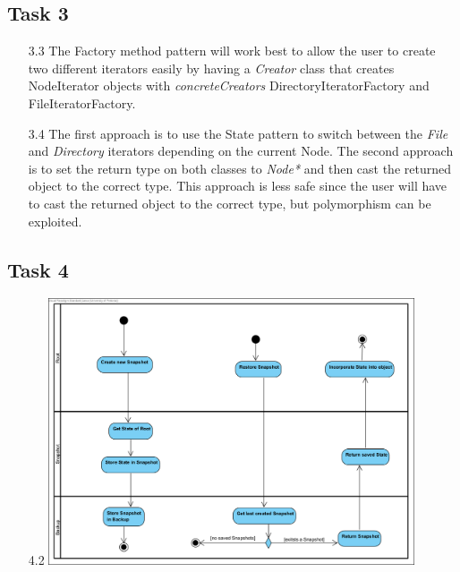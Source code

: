\documentclass{article}
\begin{document}
\subsection*{Task 3}
\begin{itemize}
    \item[3.3]The Factory method pattern will work best to allow the user to create two different iterators 
    easily by having a \textit{Creator} class that creates NodeIterator objects with \textit{concreteCreators} DirectoryIteratorFactory and FileIteratorFactory.
    \item[3.4]The first approach is to use the State pattern to switch between the \textit{File} and \textit{Directory} iterators depending on the current Node.
    The second approach is to set the return type on both classes to \textit{Node*} and then cast the returned object to the correct type. This approach is less safe since the user will have to
    cast the returned object to the correct type, but polymorphism can be exploited.
\end{itemize}


\subsection*{Task 4}
\begin{itemize}
    \item[4.2]\includegraphics[width=0.85\textwidth]{Task43.png} 
\end{itemize}

\end{document}
